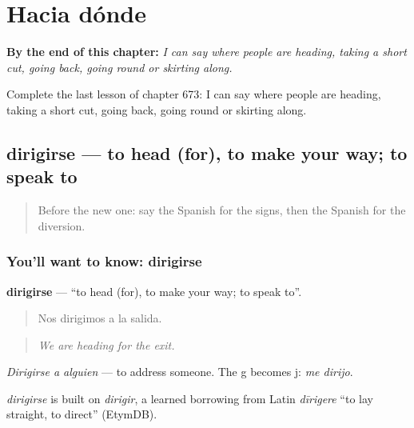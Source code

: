 
\chapter{Hacia dónde}
\label{ch:es-hacia-donde}

\begin{chapteropening}
\textbf{By the end of this chapter:} \emph{I can say where people are heading, taking a short cut, going back, going round or skirting along.}

Complete the last lesson of chapter 673: I can say where people are heading, taking a short cut, going back, going round or skirting along.
\end{chapteropening}

\section[dirigirse]{dirigirse — to head (for), to make your way; to speak to}

\label{lesson:ES-C673-dirigirse}



\begin{quote}
Before the new one: say the Spanish for the signs, then the Spanish for the diversion.
\end{quote}

\subsection*{You'll want to know: dirigirse}
\textbf{dirigirse} — \textquotedblleft{}to head (for), to make your way; to speak to\textquotedblright{}.

\begin{quote}
Nos dirigimos a la salida.
\end{quote}

\begin{quote}
\emph{We are heading for the exit.}
\end{quote}

\emph{Dirigirse a alguien} — to address someone. The g becomes j: \emph{me dirijo}.

\begin{cousinweb}
\emph{dirigirse} is built on \emph{dirigir}, a learned borrowing from Latin \emph{dīrigere} \textquotedblleft{}to lay straight, to direct\textquotedblright{} (EtymDB).
\end{cousinweb}

